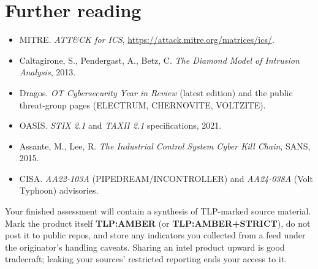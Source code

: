 \documentclass[11pt,a4paper]{article}
\begin{document}
\section*{Further reading}

\begin{itemize}\setlength{\itemsep}{1pt}
  \item MITRE. \emph{ATT\&CK for ICS}, \url{https://attack.mitre.org/matrices/ics/}.
  \item Caltagirone, S., Pendergast, A., Betz, C. \emph{The Diamond Model of
        Intrusion Analysis}, 2013.
  \item Dragos. \emph{OT Cybersecurity Year in Review} (latest edition) and the
        public threat-group pages (ELECTRUM, CHERNOVITE, VOLTZITE).
  \item OASIS. \emph{STIX 2.1} and \emph{TAXII 2.1} specifications, 2021.
  \item Assante, M., Lee, R. \emph{The Industrial Control System Cyber Kill
        Chain}, SANS, 2015.
  \item CISA. \emph{AA22-103A} (PIPEDREAM/INCONTROLLER) and \emph{AA24-038A}
        (Volt Typhoon) advisories.
\end{itemize}

\begin{warnbox}
Your finished assessment will contain a synthesis of TLP-marked source material.
Mark the product itself \textbf{TLP:AMBER} (or \textbf{TLP:AMBER+STRICT}), do not
post it to public repos, and store any indicators you collected from a feed
under the originator's handling caveats. Sharing an intel product upward is good
tradecraft; leaking your sources' restricted reporting ends your access to it.
\end{warnbox}
\end{document}
